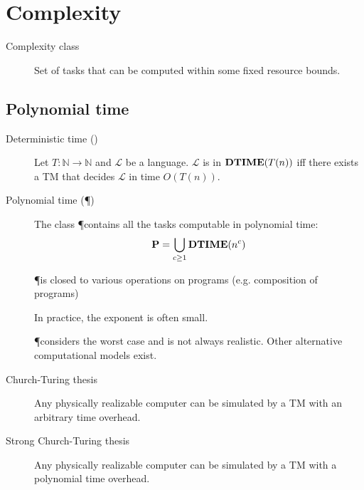 \chapter{Complexity}


\begin{description}
    \item[Complexity class] 
        Set of tasks that can be computed within some fixed resource bounds.
\end{description}



\section{Polynomial time}

\begin{description}
    \item[Deterministic time (\DTIME)] 
        Let $T: \mathbb{N} \rightarrow \mathbb{N}$ and $\mathcal{L}$ be a language.
        $\mathcal{L}$ is in $\textbf{DTIME}(T(n))$ iff
        there exists a TM that decides $\mathcal{L}$ in time $O(T(n))$.

    \item[Polynomial time (\P)] 
        The class \P contains all the tasks computable in polynomial time:
        \[ \textbf{P} = \bigcup_{c \geq 1} \textbf{DTIME}(n^c) \]

        \begin{remark}
            \P is closed to various operations on programs (e.g. composition of programs)
        \end{remark}

        \begin{remark}
            In practice, the exponent is often small.
        \end{remark}

        \begin{remark}
            \P considers the worst case and is not always realistic.
            Other alternative computational models exist.
        \end{remark}
    
    \item[Church-Turing thesis] 
        Any physically realizable computer can be simulated by a TM with an arbitrary time overhead.

    \item[Strong Church-Turing thesis] 
        Any physically realizable computer can be simulated by a TM with a polynomial time overhead.


\end{description}
